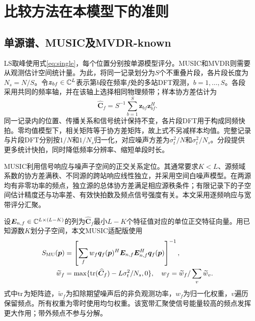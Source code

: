 \section{比较方法在本模型下的准则}\label{app:baselines}
\subsection{单源谱、MUSIC及MVDR-known}
LS取峰使用式\eqref{eq:single}，每个位置分别按单源模型评分。MUSIC和MVDR则需要从观测估计空间统计量。为此，将同一记录划分为$S$个不重叠片段，各片段长度为$N_s=N/S$。令$\bm z_{bf}\in\mathbb C^L$表示第$b$段在频率$f$处的多站DFT观测，$b=1,\ldots,S$。各段采用共同的频率轴，并在该轴上选择相同物理频带；样本协方差估计为
\begin{equation}
 \widehat{\bm C}_f=S^{-1}\sum_{b=1}^S\bm z_{bf}\bm z_{bf}^H .
\end{equation}
同一记录内的位置、传播关系和信号统计保持不变，各片段DFT用于构成同频快拍。零均值模型下，相关矩阵等于协方差矩阵，故上式不另减样本均值。完整记录与片段DFT分别按$1/N$和$1/N_s$归一化，对应噪声方差为$\sigma_t^2/N$和$\sigma_t^2/N_s$。分段提供更多统计快拍，同时降低频率分辨率、缩短单段时长。

MUSIC利用信号响应与噪声子空间的正交关系定位\cite{WeissAmar2005}。其通常要求$K<L$、源频域系数的协方差满秩、不同源的跨站响应线性独立，并采用空间白噪声模型。在两源均有非零功率的频点，独立源的总体协方差满足相应源秩条件；有限记录下的子空间估计精度还与功率差、有效快拍数及频点信号强度有关。本文采用逐频响应与宽带评分汇聚。

设$\bm E_{n,f}\in\mathbb C^{L\times(L-K)}$的列为$\widehat{\bm C}_f$最小$L-K$个特征值对应的单位正交特征向量。用已知源数$K$划分子空间，本文MUSIC适配版使用
\begin{align}
 S_{\mathrm{MU}}(\bm p)&=\left[\sum_f w_f
 \bm q_f(\bm p)^H\bm E_{n,f}\bm E_{n,f}^H\bm q_f(\bm p)\right]^{-1},\label{eq:music}\\
 \widetilde w_f&=\max\{\operatorname{tr}(\widehat{\bm C}_f)-L\sigma_t^2/N_s,0\},\quad
 w_f=\widetilde w_f/\sum_v\widetilde w_v .\nonumber
\end{align}
式中$\operatorname{tr}$为矩阵迹，$\widetilde w_f$为扣除期望噪声后的非负观测功率，$w_f$为归一化权重，$v$遍历保留频点。所有权重为零时使用均匀权重。该宽带汇聚使信号能量较高的频点发挥更大作用；带外频点不参与分解。

